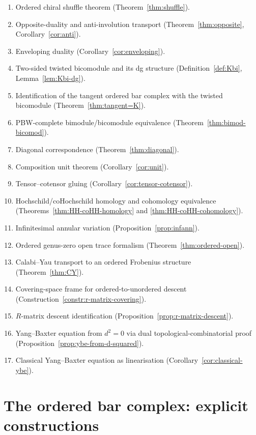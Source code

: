 \begin{enumerate}[label=(\arabic*)]
\item Ordered chiral shuffle theorem (Theorem~\ref{thm:shuffle}).
\item Opposite-duality and anti-involution transport (Theorem~\ref{thm:opposite},
Corollary~\ref{cor:anti}).
\item Enveloping duality (Corollary~\ref{cor:enveloping}).
\item Two-sided twisted bicomodule and its dg structure (Definition~\ref{def:Kbi},
Lemma~\ref{lem:Kbi-dg}).
\item Identification of the tangent ordered bar complex with the twisted bicomodule
(Theorem~\ref{thm:tangent=K}).
\item PBW-complete bimodule/bicomodule equivalence (Theorem~\ref{thm:bimod-bicomod}).
\item Diagonal correspondence (Theorem~\ref{thm:diagonal}).
\item Composition unit theorem (Corollary~\ref{cor:unit}).
\item Tensor--cotensor gluing (Corollary~\ref{cor:tensor-cotensor}).
\item Hochschild/coHochschild homology and cohomology equivalence
(Theorems~\ref{thm:HH-coHH-homology} and \ref{thm:HH-coHH-cohomology}).
\item Infinitesimal annular variation (Proposition~\ref{prop:infann}).
\item Ordered genus-zero open trace formalism (Theorem~\ref{thm:ordered-open}).
\item Calabi--Yau transport to an ordered Frobenius structure (Theorem~\ref{thm:CY}).
\item Covering-space frame for ordered-to-unordered descent
(Construction~\ref{constr:r-matrix-covering}).
\item $R$-matrix descent identification
(Proposition~\ref{prop:r-matrix-descent}).
\item Yang--Baxter equation from $d^2=0$ via dual topological-combinatorial
proof (Proposition~\ref{prop:ybe-from-d-squared}).
\item Classical Yang--Baxter equation as linearisation
(Corollary~\ref{cor:classical-ybe}).
\end{enumerate}

\bigskip

\section{The ordered bar complex: explicit constructions}

